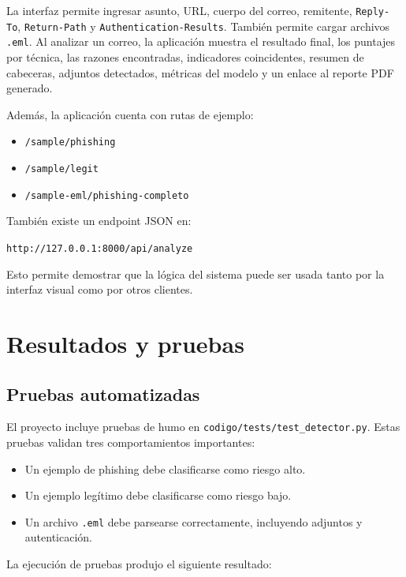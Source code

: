 \documentclass[12pt,letterpaper]{article}
\begin{document}
La interfaz permite ingresar asunto, URL, cuerpo del correo, remitente, \texttt{Reply-To}, \texttt{Return-Path} y \texttt{Authentication-Results}. También permite cargar archivos \texttt{.eml}. Al analizar un correo, la aplicación muestra el resultado final, los puntajes por técnica, las razones encontradas, indicadores coincidentes, resumen de cabeceras, adjuntos detectados, métricas del modelo y un enlace al reporte PDF generado.

Además, la aplicación cuenta con rutas de ejemplo:

\begin{itemize}
    \item \texttt{/sample/phishing}
    \item \texttt{/sample/legit}
    \item \texttt{/sample-eml/phishing-completo}
\end{itemize}

También existe un endpoint JSON en:

\begin{center}
\texttt{http://127.0.0.1:8000/api/analyze}
\end{center}

Esto permite demostrar que la lógica del sistema puede ser usada tanto por la interfaz visual como por otros clientes.

\section{Resultados y pruebas}

\subsection{Pruebas automatizadas}

El proyecto incluye pruebas de humo en \texttt{codigo/tests/test\_detector.py}. Estas pruebas validan tres comportamientos importantes:

\begin{itemize}
    \item Un ejemplo de phishing debe clasificarse como riesgo alto.
    \item Un ejemplo legítimo debe clasificarse como riesgo bajo.
    \item Un archivo \texttt{.eml} debe parsearse correctamente, incluyendo adjuntos y autenticación.
\end{itemize}

La ejecución de pruebas produjo el siguiente resultado:
\end{document}
